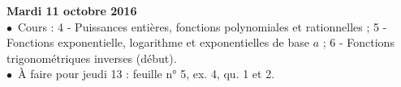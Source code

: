 \documentclass[12pt,a4paper]{article}
\begin{document}
%  
% 
% 
%  



\noindent\textbf{\bf Mardi 11 octobre 2016 }\\
$\bullet$\ Cours : 4 - Puissances entières, fonctions 
polynomiales et rationnelles ; 5 - Fonctions exponentielle, logarithme et 
exponentielles de base $a$ ; 6 - Fonctions trigonométriques inverses (début).\\
$\bullet$\ À faire pour jeudi 13 : feuille n° 5, ex. 4, qu. 1 et 2.\vspace{.4cm}\\
\end{document}
